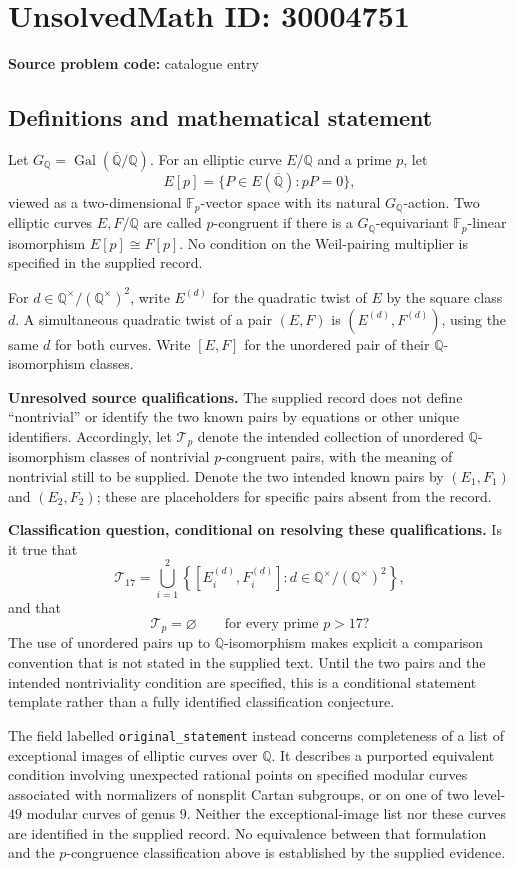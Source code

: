 \documentclass[11pt]{article}
\newcommand{\Q}{\mathbb{Q}}
\newcommand{\F}{\mathbb{F}}
\begin{document}
\section*{UnsolvedMath ID: 30004751}
\textbf{Source problem code:} catalogue entry
\subsection{Definitions and mathematical statement}
Let \(G_{\Q}=\operatorname{Gal}(\overline{\Q}/\Q)\). For an elliptic curve \(E/\Q\) and a prime \(p\), let
\[
E[p]=\{P\in E(\overline{\Q}):pP=0\},
\]
viewed as a two-dimensional \(\F_p\)-vector space with its natural \(G_{\Q}\)-action. Two elliptic curves \(E,F/\Q\) are called \(p\)-congruent if there is a \(G_{\Q}\)-equivariant \(\F_p\)-linear isomorphism \(E[p]\cong F[p]\). No condition on the Weil-pairing multiplier is specified in the supplied record.

For \(d\in\Q^\times/(\Q^\times)^2\), write \(E^{(d)}\) for the quadratic twist of \(E\) by the square class \(d\). A simultaneous quadratic twist of a pair \((E,F)\) is \((E^{(d)},F^{(d)})\), using the same \(d\) for both curves. Write \([E,F]\) for the unordered pair of their \(\Q\)-isomorphism classes.

\textbf{Unresolved source qualifications.} The supplied record does not define ``nontrivial'' or identify the two known pairs by equations or other unique identifiers. Accordingly, let \(\mathcal T_p\) denote the intended collection of unordered \(\Q\)-isomorphism classes of nontrivial \(p\)-congruent pairs, with the meaning of nontrivial still to be supplied. Denote the two intended known pairs by \((E_1,F_1)\) and \((E_2,F_2)\); these are placeholders for specific pairs absent from the record.

\textbf{Classification question, conditional on resolving these qualifications.} Is it true that
\[
\mathcal T_{17}
=
\bigcup_{i=1}^{2}
\left\{[E_i^{(d)},F_i^{(d)}]:d\in\Q^\times/(\Q^\times)^2\right\},
\]
and that
\[
\mathcal T_p=\varnothing
\qquad\text{for every prime }p>17?
\]
The use of unordered pairs up to \(\Q\)-isomorphism makes explicit a comparison convention that is not stated in the supplied text. Until the two pairs and the intended nontriviality condition are specified, this is a conditional statement template rather than a fully identified classification conjecture.

The field labelled \texttt{original\_statement} instead concerns completeness of a list of exceptional images of elliptic curves over \(\Q\). It describes a purported equivalent condition involving unexpected rational points on specified modular curves associated with normalizers of nonsplit Cartan subgroups, or on one of two level-\(49\) modular curves of genus \(9\). Neither the exceptional-image list nor these curves are identified in the supplied record. No equivalence between that formulation and the \(p\)-congruence classification above is established by the supplied evidence.
\end{document}
